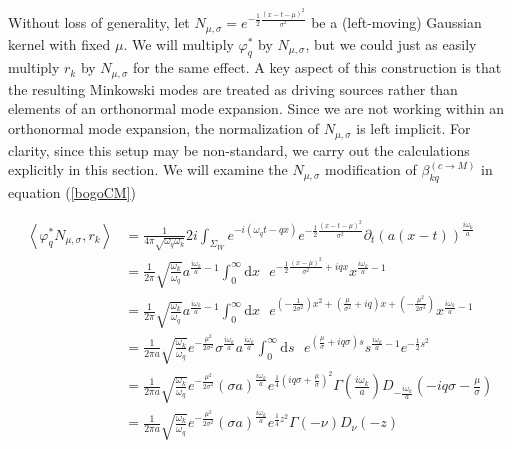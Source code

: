 \documentclass[12pt,a4paper]{article}
\newcommand{\dv}[1]{\mathrm{d} #1 \text{ }}
\begin{document}
{Without loss of generality, let $N_{\mu, \sigma} = e^{-\frac{1}{2} \frac{(x-t-\mu)^2}{\sigma^2}}$ be a (left-moving) Gaussian kernel with fixed $\mu$. We will multiply $\varphi_q^*$ by $N_{\mu, \sigma}$, but we could just as easily multiply $r_k$ by $N_{\mu, \sigma}$ for the same effect. A key aspect of this construction is that the resulting Minkowski modes are treated as driving sources rather than elements of an orthonormal mode expansion. Since we are not working within an orthonormal mode expansion, the normalization of $N_{\mu, \sigma}$ is left implicit. For clarity, since this setup may be non-standard, we carry out the calculations explicitly in this section.  We will examine the $N_{\mu,\sigma}$ modification of $\beta^{(c \rightarrow M)}_{kq}$ in  equation (\ref{bogoCM})

\begin{equation}
  \begin{aligned}
    \left< \varphi_q^* N_{\mu,\sigma}, r_k\right> &= \frac{1}{4\pi \sqrt{\omega_q \omega_k}} 2i \int_{\Sigma_W} e^{-i(\omega_q t - q x)} e^{-\frac{1}{2} \frac{(x-t-\mu)^2}{\sigma^2}} \partial_t (a(x-t))^\frac{i\omega_k}{a} \\
    &= \frac{1}{2\pi} \sqrt{\frac{\omega_k}{\omega_q}} a^{\frac{i \omega_k}{a} - 1} \int_0^\infty  \dv{x} e^{-\frac{1}{2} \frac{(x-\mu)^2}{\sigma^2} + i q x} x^{\frac{i\omega_k}{a} - 1} \\
    &= \frac{1}{2\pi} \sqrt{\frac{\omega_k}{\omega_q}} a^{\frac{i \omega_k}{a} - 1} \int_0^\infty \dv{x} e^{\left(-\frac{1}{2\sigma^2}\right) x^2 + \left(\frac{\mu}{\sigma^2} + i q \right) x + \left( -\frac{\mu^2}{2\sigma^2}\right)} x^{\frac{i\omega_k}{a} - 1}  \\
    &= \frac{1}{2\pi a} \sqrt{\frac{\omega_k}{\omega_q}} e^{-\frac{\mu^2}{2 \sigma^2}} \sigma^{\frac{i\omega_k}{a}} a^{\frac{i \omega_k}{a} }  \int_0^\infty \dv{s} e^{(\frac{\mu}{\sigma} + i q \sigma)s} s^{\frac{i\omega_k}{a} - 1} e^{-\frac{1}{2} s^2} \\
    &= \frac{1}{2\pi a} \sqrt{\frac{\omega_k}{\omega_q}} e^{-\frac{\mu^2}{2 \sigma^2}} {(\sigma a)}^{\frac{i \omega_k}{a}} e^{\frac{1}{4}(i q \sigma + \frac{\mu}{\sigma})^2} \Gamma\left(\frac{i\omega_k}{a}\right) D_{-\frac{i\omega_k}{a}}(-i q\sigma - \frac{\mu}{\sigma}) \\
    &=  \frac{1}{2\pi a } \sqrt{\frac{\omega_k}{\omega_q}} e^{-\frac{\mu^2}{2 \sigma^2}}  (\sigma a)^\frac{i\omega_k}{a} e^{\frac{1}{4} z^2} \Gamma(-\nu) D_\nu(-z)
  \end{aligned}
\end{equation}
}
\end{document}
